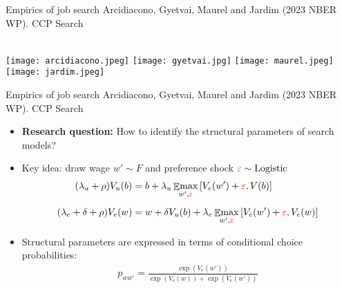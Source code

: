 \documentclass[aspectratio=169,compress,t,xcolor=table]{beamer}
\DeclareMathOperator{\E}{\mathbb{E}}                       %
\DeclareMathOperator{\Emax}{\E\!\max}                      %
\begin{document}
\begin{frame}{Empirics of job search}
Arcidiacono, Gyetvai, Maurel and Jardim (2023 NBER WP). CCP Search \\ \phantom{Identification and Estimation of Continuous-Time Job Search Models with Preference Shocks} \\ 
  \begin{center}
    \texttt{[image: arcidiacono.jpeg]} \hspace*{1em}
    \texttt{[image: gyetvai.jpg]} \hspace*{1em}
    \texttt{[image: maurel.jpeg]} \hspace*{1em}
    \texttt{[image: jardim.jpeg]}
  \end{center}
\end{frame}
\addtocounter{framenumber}{-1}

\begin{frame}{Empirics of job search}
Arcidiacono, Gyetvai, Maurel and Jardim (2023 NBER WP). CCP Search 
  \begin{itemize}
    \vfill\item {\color{MyStructure}\textbf{Research question:}} How to identify the structural parameters of search models?
    \vfill\item Key idea: draw wage \(w' \sim F\) and preference shock \({\color{red}\varepsilon} \sim \text{Logistic}\)
    \begin{align*}
      (\lambda_u + \rho) V_u(b) &= b + \lambda_u \Emax_{w', {\color{red}\varepsilon}} \left[ V_e(w') + {\color{red}\varepsilon}, V(b) \right] \\[0.5em]
      (\lambda_e + \delta + \rho) V_e(w) &= w + \delta V_u(b) +  \lambda_e \Emax_{w', {\color{red}\varepsilon}} \left[ V_e(w') + {\color{red}\varepsilon}, V_e(w) \right]
    \end{align*}
    \vfill\item Structural parameters are expressed in terms of conditional choice probabilities:
    \begin{align*}
      p_{ww'} = \frac{\exp(V_e(w'))}{\exp(V_e(w)) + \exp(V_e(w'))}
    \end{align*}
  \end{itemize}
\end{frame}
\end{document}
